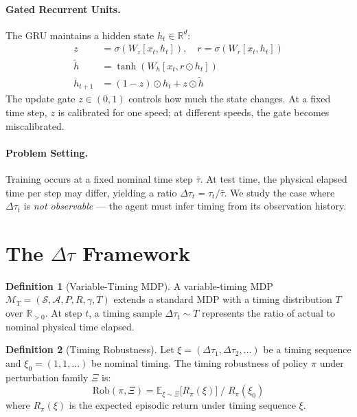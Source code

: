 \documentclass[10pt,twocolumn]{article}
\newcommand{\deltatau}{\Delta\tau}
\newcommand{\Rob}{\mathrm{Rob}}
\theoremstyle{plain}
\theoremstyle{definition}
\newtheorem{definition}{Definition}
\begin{document}
\paragraph{Gated Recurrent Units.}
The GRU \cite{cho2014learning} maintains a hidden state $h_t \in \mathbb{R}^d$:
\begin{align}
z &= \sigma(W_z[x_t, h_t]), \quad r = \sigma(W_r[x_t, h_t]) \nonumber \\
\tilde{h} &= \tanh(W_h[x_t, r \odot h_t]) \nonumber \\
h_{t+1} &= (1-z) \odot h_t + z \odot \tilde{h} \label{eq:gru}
\end{align}
The update gate $z \in (0,1)$ controls how much the state changes.
At a fixed time step, $z$ is calibrated for one speed; at different speeds,
the gate becomes miscalibrated.

\paragraph{Problem Setting.}
Training occurs at a fixed nominal time step $\bar{\tau}$.
At test time, the physical elapsed time per step may differ, yielding a ratio
$\deltatau_t = \tau_t / \bar{\tau}$.
We study the case where $\deltatau_t$ is \emph{not observable} --- the agent
must infer timing from its observation history.

\section{The $\deltatau$ Framework}
\label{sec:framework}

\begin{definition}[Variable-Timing MDP]
A variable-timing MDP $\mathcal{M}_T = (\mathcal{S}, \mathcal{A}, P, R, \gamma, T)$
extends a standard MDP with a timing distribution $T$ over $\mathbb{R}_{>0}$.
At step $t$, a timing sample $\deltatau_t \sim T$ represents the ratio of actual to
nominal physical time elapsed.
\end{definition}

\begin{definition}[Timing Robustness]
Let $\xi = (\deltatau_1, \deltatau_2, \ldots)$ be a timing sequence and
$\xi_0 = (1, 1, \ldots)$ be nominal timing.
The timing robustness of policy $\pi$ under perturbation family $\Xi$ is:
\begin{equation}
  \Rob(\pi, \Xi) = \mathbb{E}_{\xi \sim \Xi}\bigl[R_\pi(\xi)\bigr] \;/\; R_\pi(\xi_0)
  \label{eq:robustness}
\end{equation}
where $R_\pi(\xi)$ is the expected episodic return under timing sequence $\xi$.
\end{definition}
\end{document}
